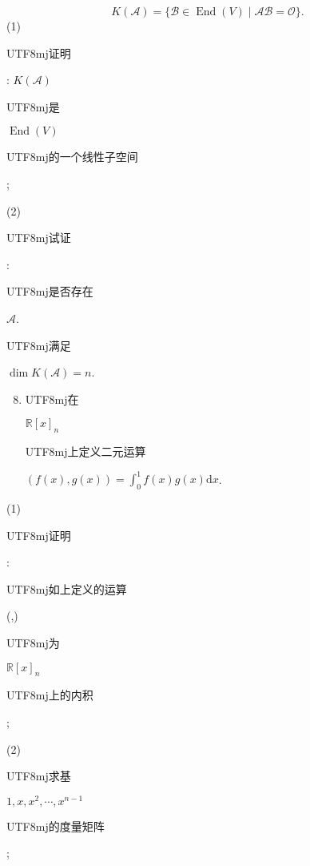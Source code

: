 \documentclass[10pt]{article}
\begin{document}
\begin{enumerate}
\end{enumerate}
$$
K(\mathscr{A})=\{\mathscr{B} \in \operatorname{End}(V) \mid \mathscr{A} \mathscr{B}=\mathscr{O}\} .
$$
(1) \begin{CJK}{UTF8}{mj}证明\end{CJK}: $K(\mathscr{A})$ \begin{CJK}{UTF8}{mj}是\end{CJK} $\operatorname{End}(V)$ \begin{CJK}{UTF8}{mj}的一个线性子空间\end{CJK};

(2) \begin{CJK}{UTF8}{mj}试证\end{CJK}: \begin{CJK}{UTF8}{mj}是否存在\end{CJK} $\mathscr{A}$. \begin{CJK}{UTF8}{mj}满足\end{CJK} $\operatorname{dim} K(\mathscr{A})=n$.

\begin{enumerate}
  \setcounter{enumi}{7}
  \item \begin{CJK}{UTF8}{mj}在\end{CJK} $\mathbb{R}[x]_{n}$ \begin{CJK}{UTF8}{mj}上定义二元运算\end{CJK} $(f(x), g(x))=\int_{0}^{1} f(x) g(x) \mathrm{d} x$.
\end{enumerate}
(1) \begin{CJK}{UTF8}{mj}证明\end{CJK}: \begin{CJK}{UTF8}{mj}如上定义的运算\end{CJK} (,) \begin{CJK}{UTF8}{mj}为\end{CJK} $\mathbb{R}[x]_{n}$ \begin{CJK}{UTF8}{mj}上的内积\end{CJK};

(2) \begin{CJK}{UTF8}{mj}求基\end{CJK} $1, x, x^{2}, \cdots, x^{n-1}$ \begin{CJK}{UTF8}{mj}的度量矩阵\end{CJK};
\end{document}
